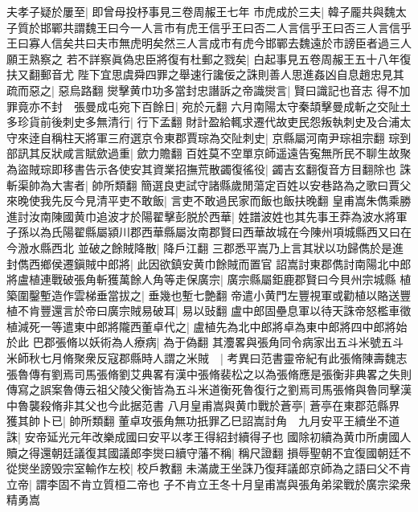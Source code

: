 夫孝子疑於屢至|{
	即曾母投杼事見三卷周赧王七年}
市虎成於三夫|{
	韓子龎共與魏太子質於邯鄲共謂魏王曰今一人言市有虎王信乎王曰否二人言信乎王曰否三人言信乎王曰寡人信矣共曰夫市無虎明矣然三人言成市有虎今邯鄲去魏遠於市謗臣者過三人願王熟察之}
若不詳察眞偽忠臣將復有杜郵之戮矣|{
	白起事見五卷周赧王五十八年復扶又翻郵音尤}
陛下宜思虞舜四罪之舉速行讒佞之誅則善人思進姦凶自息趙忠見其疏而惡之|{
	惡烏路翻}
爕擊黄巾功多當封忠譖訴之帝識爕言|{
	賢曰識記也音志}
得不加罪竟亦不封　張曼成屯宛下百餘日|{
	宛於元翻}
六月南陽太守秦頡擊曼成斬之交阯土多珍貨前後刺史多無清行|{
	行下孟翻}
財計盈給輒求遷代故吏民怨叛執刺史及合浦太守來逹自稱柱天將軍三府選京令東郡賈琮為交阯刺史|{
	京縣屬河南尹琮祖宗翻}
琮到部訊其反狀咸言賦歛過重|{
	歛力贍翻}
百姓莫不空單京師遥遠告寃無所民不聊生故聚為盜賊琮即移書告示各使安其資業招撫荒散蠲復徭役|{
	蠲吉玄翻復音方目翻除也}
誅斬渠帥為大害者|{
	帥所類翻}
簡選良吏試守諸縣歲閒蕩定百姓以安巷路為之歌曰賈父來晚使我先反今見清平吏不敢飯|{
	言吏不敢過民家而飯也飯扶晚翻}
皇甫嵩朱儁乘勝進討汝南陳國黄巾追波才於陽翟擊彭脱於西華|{
	姓譜波姓也其先事王莽為波水將軍子孫以為氏陽翟縣屬潁川郡西華縣屬汝南郡賢曰西華故城在今陳州項城縣西又曰在今溵水縣西北}
並破之餘賊降散|{
	降戶江翻}
三郡悉平嵩乃上言其狀以功歸儁於是進封儁西鄉侯遷鎭賊中郎將|{
	此因欲鎮安黄巾餘賊而置官}
詔嵩討東郡儁討南陽北中郎將盧植連戰破張角斬獲萬餘人角等走保廣宗|{
	廣宗縣屬鉅鹿郡賢曰今貝州宗城縣}
植築圍鑿塹造作雲梯垂當拔之|{
	垂幾也塹七艶翻}
帝遣小黄門左豐視軍或勸植以賂送豐植不肯豐還言於帝曰廣宗賊易破耳|{
	易以䜴翻}
盧中郎固壘息軍以待天誅帝怒檻車徵植減死一等遣東中郎將隴西董卓代之|{
	盧植先為北中郎將卓為東中郎將四中郎將始於此}
巴郡張脩以妖術為人療病|{
	為于偽翻}
其灋畧與張角同令病家出五斗米號五斗米師秋七月脩聚衆反寇郡縣時人謂之米賊　|{
	考異曰范書靈帝紀有此張脩陳壽魏志張魯傳有劉焉司馬張脩劉艾典畧有漢中張脩裴松之以為張脩應是張衡非典畧之失則傳寫之誤案魯傳云祖父陵父衡皆為五斗米道衡死魯復行之劉焉司馬張脩與魯同擊漢中魯襲殺脩非其父也今此据范書}
八月皇甫嵩與黄巾戰於蒼亭|{
	蒼亭在東郡范縣界}
獲其帥卜已|{
	帥所類翻}
董卓攻張角無功扺罪乙巳詔嵩討角　九月安平王續坐不道誅|{
	安帝延光元年改樂成國曰安平以孝王得紹封續得子也}
國除初續為黄巾所虜國人贖之得還朝廷議復其國議郎李爕曰續守藩不稱|{
	稱尺證翻}
損辱聖朝不宜復國朝廷不從爕坐謗毁宗室輸作左校|{
	校戶教翻}
未滿歲王坐誅乃復拜議郎京師為之語曰父不肯立帝|{
	謂李固不肯立質桓二帝也}
子不肯立王冬十月皇甫嵩與張角弟梁戰於廣宗梁衆精勇嵩

